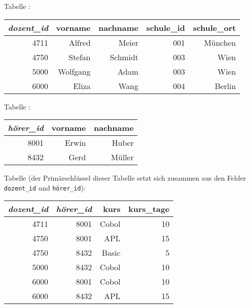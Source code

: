 \begin{minipage}{0.65\textwidth}
Tabelle :

\vspace{2mm}

\hspace{0mm}
\begin{tabular}{|r|r|r|r|r|}\hline
\textbf{\em dozent\_id} & \textbf{vorname} & \textbf{nachname}
& \textbf{schule\_id} & \textbf{schule\_ort}\\ \hline 
4711 & Alfred   & Meier   & 001 & München\\ \hline 
4750 & Stefan   & Schmidt & 003 & Wien   \\ \hline
5000 & Wolfgang & Adam    & 003 & Wien   \\ \hline
6000 & Eliza    & Wang    & 004 & Berlin \\ \hline
\end{tabular}
\end{minipage}
\begin{minipage}{0.30\textwidth}
Tabelle :

\vspace{2mm}

\begin{tabular}{|r|r|r|}\hline
\textbf{\em hörer\_id} & \textbf{vorname} & \textbf{nachname}\\ \hline
8001 & Erwin & Huber  \\ \hline
8432 & Gerd & Müller \\ \hline
\end{tabular}
\end{minipage}

\vspace{2mm}

Tabelle  (der Primärschlüssel dieser Tabelle setzt
sich zusammen aus den Felder \lstinline|dozent_id| und \lstinline|hörer_id|):

\hspace{0mm}
\begin{tabular}{|r|r|r|r|}\hline
\textbf{\em dozent\_id} & \textbf{\em hörer\_id} & \textbf{kurs} &
\textbf{kurs\_tage}\\ \hline 4711 & 8001 & Cobol & 10\\ \hline
4750 & 8001 & APL   & 15\\ \hline
4750 & 8432 & Basic &  5\\ \hline
5000 & 8432 & Cobol & 10\\ \hline
6000 & 8001 & Cobol & 10\\ \hline
6000 & 8432 & APL   & 15\\ \hline
\end{tabular}

